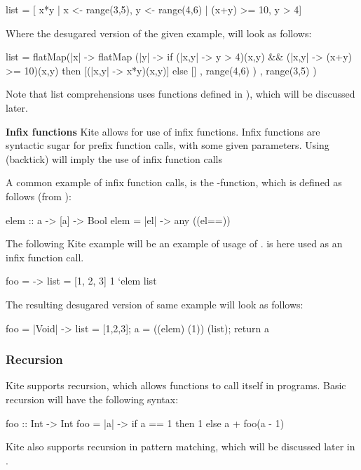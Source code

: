 \begin{kite}
list = [ x*y | x <- range(3,5), y <- range(4,6) | (x+y) >= 10, y > 4]
\end{kite}

Where the desugared version of the given example, will look as follows:

\begin{kite}
list =
flatMap(|x| -> {
  flatMap (|y| -> {
    if (|x,y| -> {y > 4})(x,y) && (|x,y| -> {(x+y) >= 10})(x,y)
       then [(|x,y| -> {x*y})(x,y)]
       else []
  } , range(4,6) )
}, range(3,5) )
\end{kite}

Note that list comprehensions uses functions defined in ), which will be discussed later.

\textbf{Infix functions} Kite allows for use of infix functions. Infix functions are syntactic sugar for prefix function calls, with some given parameters. Using  (backtick) will imply the use of infix function calls

A common example of infix function calls, is the -function, which is defined as follows (from ):
\begin{kite}
  elem :: a -> [a] -> Bool
  elem = |el| -> {
    any ((el==))
  }
\end{kite}

The following Kite example will be an example of usage of .  is here used as an infix function call.
\begin{kite}
  foo =  -> {
    list = [1, 2, 3]
    1 `elem list
  }
\end{kite}
The resulting desugared version of same example will look as follows:

\begin{kite}
  foo = |Void| -> {
    list = [1,2,3];
    a = ((elem) (1)) (list);
    return a
  }
\end{kite}

\subsubsection{Recursion}
Kite supports recursion, which allows functions to call itself in programs. Basic recursion will have the following syntax:
\begin{kite}
  foo :: Int -> Int
  foo = |a| -> {
    if a == 1 then 1
    else a + foo(a - 1)
  }
\end{kite}

Kite also supports recursion in pattern matching, which will be discussed later in .

